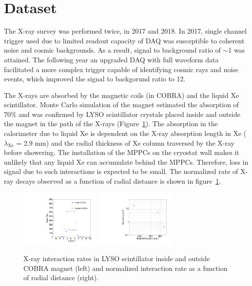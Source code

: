 \section{\label{sec5}Dataset}
The X-ray survey was performed twice, in 2017 and 2018.  In 2017,
single channel trigger used due to limited readout capacity of
DAQ was susceptible to coherent noise and cosmic backgrounds. As a
result, signal to background ratio of $\sim$1 was attained.  The
following year an upgraded DAQ with full waveform data facilitated a
more complex trigger capable of identifying
cosmic rays and noise events, which improved the signal to backgorund ratio
to 12.

The X-rays are absorbed by the magnetic coils (in COBRA) and the
liquid Xe scintillator.  Monte Carlo simulation of the magnet
estimated the absorption of 70\% and was confirmed by LYSO
scintillator crystals placed inside and outside the magnet in the path
of the X-rays (Figure~\ref{fig:absorption}). The absorption in the
calorimeter due to liquid Xe is dependent on the X-ray absorption
length in Xe ($\lambda_{\mathrm{Xe}}$ = 2.9 mm) and the radial
thickness of Xe column traversed by the X-ray before showering.  The
installation of the MPPCs on the cryostat wall makes it unlikely that
any liquid Xe can accumulate behind the MPPCs\cite{megdesign}.
Therefore, loss in signal due to such interactions is expected to be
small.  The normalized rate of X-ray decays observed as a function of
radial distance is shown in figure~\ref{fig:absorption}.

\begin{figure}[]
\includegraphics[width=4cm]{plots/xray_cobra_absorption}
\includegraphics[width=4cm]{plots/rate_vs_radius} 
\caption{X-ray
interaction rates in LYSO scintillator inside and outside COBRA magnet
(left) and normalized interaction rate as a function of radial
distance (right).} \label{fig:absorption} 
\end{figure}  



